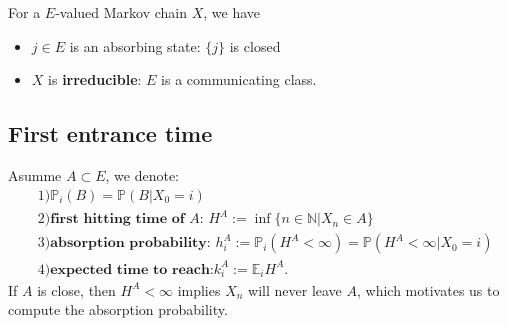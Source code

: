 \begin{definition}
	For a $E$-valued Markov chain $X$, we have
	\begin{itemize}
		\item $j \in E$ is an absorbing state: $\{j\}$ is closed
		\item $X$ is \textbf{irreducible}: $E$ is a communicating class.
	\end{itemize}
\end{definition}


\subsection{First entrance time}
Asumme $A \subset E$, we denote:
\begin{align*}
	&1)\mathbb{P}_i(B) = \mathbb{P}(B|X_0 = i)\\
	&2)\textbf{first hitting time of $A$: } H^A:= \inf \{ n \in \mathbb{N}| X_n \in A\} \\
	&3)\textbf{absorption probability: }h_i^A:= \mathbb{P}_i(H^A < \infty) = \mathbb{P}(H^A < \infty |X_0 = i)\\
	&4)\textbf{expected time to reach:} k_i^A:= \mathbb{E}_i H^A.
\end{align*}
If $A$ is close, then $H^A < \infty$ implies $X_n$ will never leave $A$, which motivates us to compute the absorption probability.

